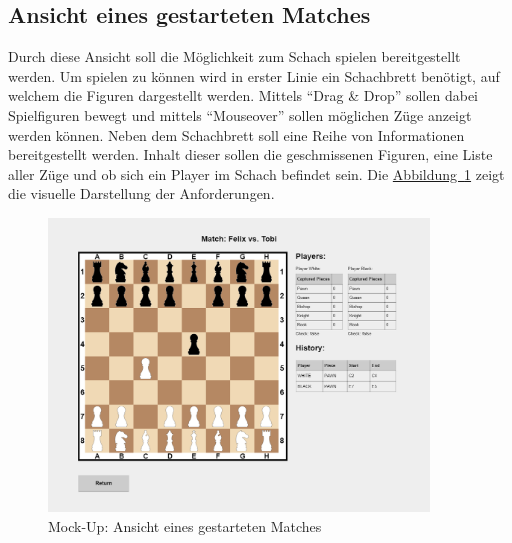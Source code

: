 \subsection{Ansicht eines gestarteten Matches}\label{sec:gameView}
Durch diese Ansicht soll die Möglichkeit zum Schach spielen bereitgestellt werden. Um spielen zu können wird in erster Linie ein Schachbrett benötigt, auf welchem die Figuren dargestellt werden. Mittels \enquote{Drag \& Drop} sollen dabei Spielfiguren bewegt und mittels \enquote{Mouseover} sollen möglichen Züge anzeigt werden können. Neben dem Schachbrett soll eine Reihe von Informationen bereitgestellt werden. Inhalt dieser sollen die geschmissenen Figuren, eine Liste aller Züge und ob sich ein Player im Schach befindet sein. Die \hyperref[fig:gameView]{Abbildung~\ref{fig:gameView}} zeigt die visuelle Darstellung der Anforderungen.
\begin{figure}[htb]
	\includegraphics[width=0.9\textwidth]{images/game-view.png}
	\caption{Mock-Up: Ansicht eines gestarteten Matches}
	\label{fig:gameView}
\end{figure}


